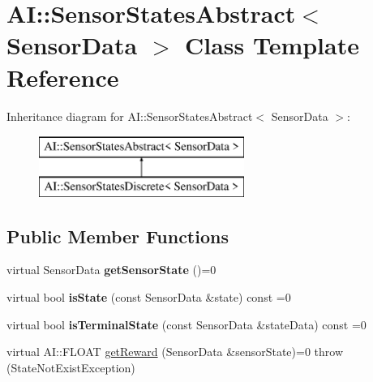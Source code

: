 \hypertarget{classAI_1_1SensorStatesAbstract}{\section{A\-I\-:\-:Sensor\-States\-Abstract$<$ Sensor\-Data $>$ Class Template Reference}
\label{classAI_1_1SensorStatesAbstract}
}
Inheritance diagram for A\-I\-:\-:Sensor\-States\-Abstract$<$ Sensor\-Data $>$\-:\begin{figure}[H]
\begin{center}
\leavevmode
\includegraphics[height=2.000000cm]{classAI_1_1SensorStatesAbstract}
\end{center}
\end{figure}
\subsection*{Public Member Functions}
\begin{DoxyCompactItemize}
\item 
\hypertarget{classAI_1_1SensorStatesAbstract_a37449f66aa7d83e51b103422814e5a1a}{virtual Sensor\-Data {\bfseries get\-Sensor\-State} ()=0}\label{classAI_1_1SensorStatesAbstract_a37449f66aa7d83e51b103422814e5a1a}

\item 
\hypertarget{classAI_1_1SensorStatesAbstract_a457343da49a26e0eb7427447b0b2ae6c}{virtual bool {\bfseries is\-State} (const Sensor\-Data \&state) const =0}\label{classAI_1_1SensorStatesAbstract_a457343da49a26e0eb7427447b0b2ae6c}

\item 
\hypertarget{classAI_1_1SensorStatesAbstract_a708db5a1df2d1ea540dd6dc5190561bd}{virtual bool {\bfseries is\-Terminal\-State} (const Sensor\-Data \&state\-Data) const =0}\label{classAI_1_1SensorStatesAbstract_a708db5a1df2d1ea540dd6dc5190561bd}

\item 
virtual A\-I\-::\-F\-L\-O\-A\-T \hyperlink{classAI_1_1SensorStatesAbstract_a8631617987cf161e0900d7bb4f7b6576}{get\-Reward} (Sensor\-Data \&sensor\-State)=0  throw (\-State\-Not\-Exist\-Exception)
\end{DoxyCompactItemize}


